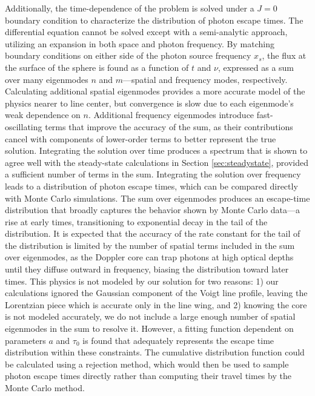 \documentclass{aastex63}
\begin{document}
Additionally, the time-dependence of the problem is solved under a $J=0$ boundary condition to characterize the distribution of photon escape times. The differential equation cannot be solved except with a semi-analytic approach, utilizing an expansion in both space and photon frequency. By matching boundary conditions on either side of the photon source frequency $x_s$, the flux at the surface of the sphere is found as a function of $t$ and $\nu$, expressed as a sum over many eigenmodes $n$ and $m$---spatial and frequency modes, respectively. Calculating additional spatial eigenmodes provides a more accurate model of the physics nearer to line center, but convergence is slow due to each eigenmode's weak dependence on $n$. Additional frequency eigenmodes introduce fast-oscillating terms that improve the accuracy of the sum, as their contributions cancel with components of lower-order terms to better represent the true solution. Integrating the solution over time produces a spectrum that is shown to agree well with the steady-state calculations in Section \ref{sec:steadystate}, provided a sufficient number of terms in the sum. Integrating the solution over frequency leads to a distribution of photon escape times, which can be compared directly with Monte Carlo simulations. The sum over eigenmodes produces an escape-time distribution that broadly captures the behavior shown by Monte Carlo data---a rise at early times, transitioning to exponential decay in the tail of the distribution. It is expected that the accuracy of the rate constant for the tail of the distribution is limited by the number of spatial terms included in the sum over eigenmodes, as the Doppler core can trap photons at high optical depths until they diffuse outward in frequency, biasing the distribution toward later times. This physics is not modeled by our solution for two reasons: 1) our calculations ignored the Gaussian component of the Voigt line profile, leaving the Lorentzian piece which is accurate only in the line wing, and 2) knowing the core is not modeled accurately, we do not include a large enough number of spatial eigenmodes in the sum to resolve it. However, a fitting function dependent on parameters $a$ and $\tau_0$ is found that adequately represents the escape time distribution within these constraints. The cumulative distribution function could be calculated using a rejection method, which would then be used to sample photon escape times directly rather than computing their travel times by the Monte Carlo method.
\end{document}
